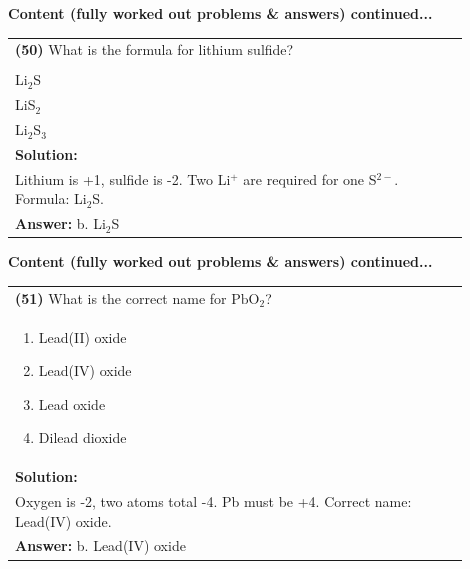 \documentclass{article}
\begin{document}
{\newpage
\noindent
{\large\textbf{Content (fully worked out problems \& answers) continued...}}\\[0.2em]

\begin{tabular}{|p{0.9\linewidth}|}
\hline
\vspace{0.2cm}
\textbf{(50)} What is the formula for lithium sulfide? \\
\begin{minipage}[t]{0.85\linewidth}
\begin{enumerate}[label=\alph*.]
\item LiS \\
\item Li$_2$S \\
\item LiS$_2$ \\
\item Li$_2$S$_3$
\end{enumerate}
\end{minipage}\\
\hline
\vspace{0.2cm}
\textbf{Solution:} \\
Lithium is +1, sulfide is -2. Two Li$^{+}$ are required for one S$^{2-}$. Formula: Li$_2$S. \\
\hline
\vspace{0.2cm}
\textbf{Answer:} b. Li$_2$S \\
\hline
\end{tabular}


\newpage
\noindent
{\large\textbf{Content (fully worked out problems \& answers) continued...}}\\[0.2em]

\begin{tabular}{|p{0.9\linewidth}|}
\hline
\vspace{0.2cm}
\textbf{(51)} What is the correct name for $\text{PbO}_2$? \\
\begin{minipage}[t]{0.85\linewidth}
\begin{enumerate}[label=\alph*.]
\item Lead(II) oxide \
\item Lead(IV) oxide \
\item Lead oxide \
\item Dilead dioxide
\end{enumerate}
\end{minipage}\\
\hline
\vspace{0.2cm}
\textbf{Solution:} \\
Oxygen is -2, two atoms total -4. Pb must be +4. Correct name: Lead(IV) oxide. \\
\hline
\vspace{0.2cm}
\textbf{Answer:} b. Lead(IV) oxide \
\hline
\end{tabular}

}
\end{document}
